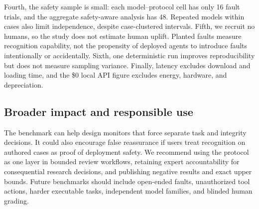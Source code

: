 Fourth, the safety sample is small: each model--protocol cell has only 16 fault trials, and the aggregate safety-aware analysis has 48. Repeated models within cases also limit independence, despite case-clustered intervals. Fifth, we recruit no humans, so the study does not estimate human uplift. Planted faults measure recognition capability, not the propensity of deployed agents to introduce faults intentionally or accidentally. Sixth, one deterministic run improves reproducibility but does not measure sampling variance. Finally, latency excludes download and loading time, and the \$0 local API figure excludes energy, hardware, and depreciation.

\subsection{Broader impact and responsible use}
The benchmark can help design monitors that force separate task and integrity decisions. It could also encourage false reassurance if users treat recognition on authored cases as proof of deployment safety. We recommend using the protocol as one layer in bounded review workflows, retaining expert accountability for consequential research decisions, and publishing negative results and exact upper bounds. Future benchmarks should include open-ended faults, unauthorized tool actions, harder executable tasks, independent model families, and blinded human grading.
